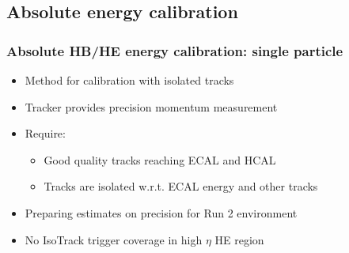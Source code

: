 \documentclass[bigger]{beamer}
\begin{document}
\subsection{Absolute energy calibration}
\label{sec-2-4}
\begin{frame}
\frametitle{Absolute HB/HE energy calibration: single particle}
\label{sec-2-4-1}
\begin{itemize}

\item Method for calibration with isolated tracks
\label{sec-2-4-1-1}%

\item Tracker provides precision momentum measurement
\label{sec-2-4-1-2}%

\item Require:
\label{sec-2-4-1-3}%
\begin{itemize}

\item Good quality tracks reaching ECAL and HCAL
\label{sec-2-4-1-3-1}%

\item Tracks are isolated w.r.t. ECAL energy and other tracks
\label{sec-2-4-1-3-2}%
\end{itemize} %

\item Preparing estimates on precision for Run 2 environment
\label{sec-2-4-1-4}%

\item No IsoTrack trigger coverage in high $\eta$ HE region
\label{sec-2-4-1-5}%
\end{itemize} %
\end{frame}
\end{document}
